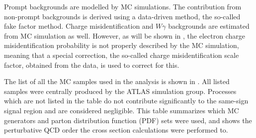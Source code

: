Prompt backgrounds are modelled by MC simulations. 
The contribution from non-prompt backgrounds is derived using a data-driven method, the so-called fake factor method.
Charge misidentification and $W\gamma$ backgrounds are estimated from MC simulation as well. However, as will be shown in , the electron charge misidentification probability is not properly described by the MC simulation, meaning that a special correction, the so-called charge misidentification scale factor, obtained from the data, is used to correct for this.

The list of all the MC samples used in the analysis is shown in . 
All listed samples were centrally produced by the ATLAS simulation group.
Processes which are not listed in the table do not contribute
significantly to the same-sign signal region and are considered negligible.
This table summarizes which MC generators and parton distribution function (PDF) sets were used, and shows the perturbative QCD order the cross section calculations were performed to.


